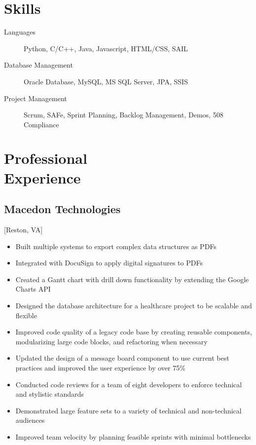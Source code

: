\documentclass{mycv}
\begin{document}
\maketitle%

\section{Skills}

\begin{description}
  \item[Languages] Python, C/C++, Java, Javascript, HTML/CSS, SAIL
  \item[Database Management] Oracle Database, MySQL, MS SQL Server, JPA, SSIS
  \item[Project Management] Scrum, SAFe, Sprint Planning, Backlog Management, Demos, 508 \\ Compliance
\end{description}

\section{Professional \\ Experience}

\subsection{Macedon Technologies}[Reston, VA]
\begin{positions}
\end{positions}

\begin{itemize}
  \item Built multiple systems to export complex data structures as PDFs
  \item Integrated with DocuSign to apply digital signatures to PDFs
  \item Created a Gantt chart with drill down functionality by extending the Google Charts API
  \item Designed the database architecture for a healthcare project to be scalable and flexible
  \item Improved code quality of a legacy code base by creating reusable components, modularizing large code blocks, and refactoring when necessary
  \item Updated the design of a message board component to use current best practices and improved the user experience by over 75\%
  \item Conducted code reviews for a team of eight developers to enforce technical and stylistic standards
  \item Demonstrated large feature sets to a variety of technical and non-technical audiences
  \item Improved team velocity by planning feasible sprints with minimal bottlenecks
\end{itemize}
\end{document}

